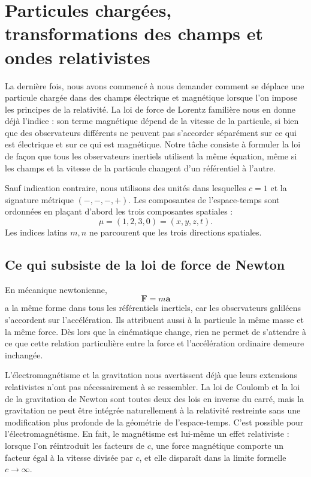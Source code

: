 \chapter{Particules chargées, transformations des champs et ondes relativistes}

La dernière fois, nous avons commencé à nous demander comment se déplace une particule chargée dans des champs électrique et magnétique lorsque l’on impose les principes de la relativité. La loi de force de Lorentz familière nous en donne déjà l’indice : son terme magnétique dépend de la vitesse de la particule, si bien que des observateurs différents ne peuvent pas s’accorder séparément sur ce qui est électrique et sur ce qui est magnétique. Notre tâche consiste à formuler la loi de façon que tous les observateurs inertiels utilisent la même équation, même si les champs et la vitesse de la particule changent d’un référentiel à l’autre.

Sauf indication contraire, nous utilisons des unités dans lesquelles \(c=1\) et la signature métrique \((-,-,-,+)\). Les composantes de l’espace-temps sont ordonnées en plaçant d’abord les trois composantes spatiales :
\begin{equation}
  \mu=(1,2,3,0)=(x,y,z,t).
\end{equation}
Les indices latins \(m,n\) ne parcourent que les trois directions spatiales.

\section{Ce qui subsiste de la loi de force de Newton}

En mécanique newtonienne,
\begin{equation}
  \boldsymbol F=m\boldsymbol a
\end{equation}
a la même forme dans tous les référentiels inertiels, car les observateurs galiléens s’accordent sur l’accélération. Ils attribuent aussi à la particule la même masse et la même force. Dès lors que la cinématique change, rien ne permet de s’attendre à ce que cette relation particulière entre la force et l’accélération ordinaire demeure inchangée.

L’électromagnétisme et la gravitation nous avertissent déjà que leurs extensions relativistes n’ont pas nécessairement à se ressembler. La loi de Coulomb et la loi de la gravitation de Newton sont toutes deux des lois en inverse du carré, mais la gravitation ne peut être intégrée naturellement à la relativité restreinte sans une modification plus profonde de la géométrie de l’espace-temps. C’est possible pour l’électromagnétisme. En fait, le magnétisme est lui-même un effet relativiste : lorsque l’on réintroduit les facteurs de \(c\), une force magnétique comporte un facteur égal à la vitesse divisée par \(c\), et elle disparaît dans la limite formelle \(c\to\infty\).

